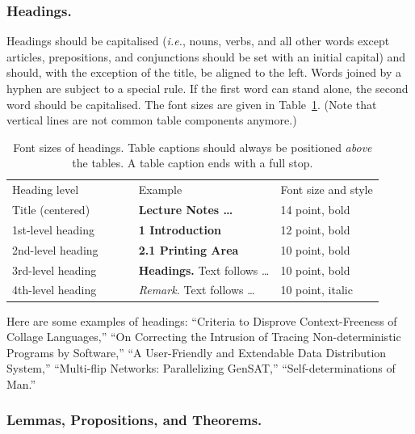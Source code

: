 \documentclass[runningheads]{llncs}
\begin{document}
\subsubsection{Headings.}

Headings should be capitalised
({\it i.e.}, nouns, verbs, and all other words
except articles, prepositions, and conjunctions should be set with an
initial capital) and should,
with the exception of the title, be aligned to the left.
Words joined by a hyphen are subject to a special rule. If the first
word can stand alone, the second word should be capitalised.
The font sizes
are given in Table~\ref{table:headings}. (Note that vertical lines
are not common table components anymore.)
%
\setlength{\tabcolsep}{4pt}
\begin{table}
\begin{center}
\caption{
Font sizes of headings. Table captions should always be
positioned {\it above} the tables. A table
caption ends with a full stop.
}
\label{table:headings}
\begin{tabular}{lll}
\hline\noalign{\smallskip}
Heading level $\qquad\qquad$& Example & Font size and style\\
\noalign{\smallskip}
\hline
\noalign{\smallskip}
Title (centered)  & {\Large \bf Lecture Notes \dots} $\qquad$& 14 point, bold\\
1st-level heading & {\large \bf 1 Introduction} & 12 point, bold\\
2nd-level heading & {\bf 2.1 Printing Area} & 10 point, bold\\
3rd-level heading & {\bf Headings.} Text follows \dots & 10 point, bold
\\
4th-level heading & {\it Remark.} Text follows \dots & 10 point,
italic\\
\hline
\end{tabular}
\end{center}
\end{table}
\setlength{\tabcolsep}{1.4pt}

Here are
some examples of headings: ``Criteria to Disprove Context-Freeness of
Collage Languages,'' ``On Correcting the Intrusion of Tracing
Non-deterministic Programs by Software,'' ``A User-Friendly and
Extendable Data Distribution System,'' ``Multi-flip Networks:
Parallelizing GenSAT,'' ``Self-determinations of Man.''

\subsubsection{Lemmas, Propositions, and Theorems.}
\end{document}
